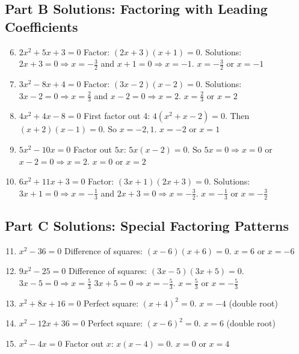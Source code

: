 \documentclass[14pt]{extarticle}
\begin{document}
\subsection*{Part B Solutions: Factoring with Leading Coefficients}
\begin{enumerate}
  \setcounter{enumi}{5}
  \item \(2x^2 + 5x + 3 = 0\)  
  Factor: \((2x + 3)(x + 1) = 0.\)  
  Solutions: \(2x + 3 = 0 \Rightarrow x = -\tfrac{3}{2}\) and \(x + 1 = 0 \Rightarrow x = -1.\)  
  \(\boxed{x = -\tfrac{3}{2} \text{ or } x = -1}\)

  \item \(3x^2 - 8x + 4 = 0\)  
  Factor: \((3x - 2)(x - 2) = 0.\)  
  Solutions: \(3x - 2 = 0 \Rightarrow x = \tfrac{2}{3}\) and \(x - 2 = 0 \Rightarrow x = 2.\)  
  \(\boxed{x = \tfrac{2}{3} \text{ or } x = 2}\)

  \item \(4x^2 + 4x - 8 = 0\)  
  First factor out 4: \(4(x^2 + x - 2) = 0.\)  
  Then \((x + 2)(x - 1) = 0.\)  
  So \(x = -2, 1.\)  
  \(\boxed{x = -2 \text{ or } x = 1}\)

  \item \(5x^2 - 10x = 0\)  
  Factor out \(5x\): \(5x(x - 2) = 0.\)  
  So \(5x = 0 \Rightarrow x = 0\) or \(x - 2 = 0 \Rightarrow x = 2.\)  
  \(\boxed{x = 0 \text{ or } x = 2}\)

  \item \(6x^2 + 11x + 3 = 0\)  
  Factor: \((3x + 1)(2x + 3) = 0.\)  
  Solutions: \(3x + 1 = 0 \Rightarrow x = -\tfrac{1}{3}\) and \(2x + 3 = 0 \Rightarrow x = -\tfrac{3}{2}.\)  
  \(\boxed{x = -\tfrac{1}{3} \text{ or } x = -\tfrac{3}{2}}\)
\end{enumerate}

\subsection*{Part C Solutions: Special Factoring Patterns}
\begin{enumerate}
  \setcounter{enumi}{10}
  \item \(x^2 - 36 = 0\)  
  Difference of squares: \((x - 6)(x + 6) = 0.\)  
  \(\boxed{x = 6 \text{ or } x = -6}\)

  \item \(9x^2 - 25 = 0\)  
  Difference of squares: \((3x - 5)(3x + 5) = 0.\)  
  \(3x - 5 = 0 \Rightarrow x = \tfrac{5}{3}\)  
  \(3x + 5 = 0 \Rightarrow x = -\tfrac{5}{3}.\)  
  \(\boxed{x = \tfrac{5}{3} \text{ or } x = -\tfrac{5}{3}}\)

  \item \(x^2 + 8x + 16 = 0\)  
  Perfect square: \((x + 4)^2 = 0.\)  
  \(\boxed{x = -4}\) (double root)

  \item \(x^2 - 12x + 36 = 0\)  
  Perfect square: \((x - 6)^2 = 0.\)  
  \(\boxed{x = 6}\) (double root)

  \item \(x^2 - 4x = 0\)  
  Factor out \(x\): \(x(x - 4) = 0.\)  
  \(\boxed{x = 0 \text{ or } x = 4}\)
\end{enumerate}
\end{document}
